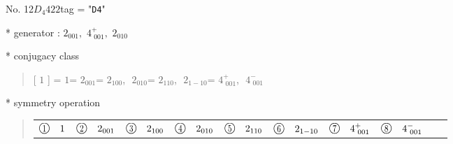 \documentclass[fleqn,10pt,landscape]{jsarticle}
\begin{document}
\newpage

No. 12\quad$D_{4}$\quad$422$\quad[ tetragonal ]
tag = "{\tt D4}"

* generator : $2{}_{001},\,\,4^{+}_{\,\,001},\,\,2{}_{010}$

* conjugacy class
\begin{quote}
[ $1$ ] = \quad $1$\newline[ $2{}_{001}$ ] = \quad $2{}_{001}$\newline[ $2{}_{100}$ ] = \quad $2{}_{100}$,\,\, $2{}_{010}$\newline[ $2{}_{110}$ ] = \quad $2{}_{110}$,\,\, $2{}_{1-10}$\newline[ $4^{+}_{\,\,001}$ ] = \quad $4^{+}_{\,\,001}$,\,\, $4^{-}_{\,\,001}$\newline
\end{quote}

* symmetry operation
\begin{quote}
\begin{tabular}{llllllllll}
$ {\ooalign{\hfil\resizebox{.8\width}{\height}{1}\hfil\crcr\raise.1ex\hbox{\large$\bigcirc$}}}\quad 1 $ & $ {\ooalign{\hfil\resizebox{.8\width}{\height}{2}\hfil\crcr\raise.1ex\hbox{\large$\bigcirc$}}}\quad 2{}_{001} $ & $ {\ooalign{\hfil\resizebox{.8\width}{\height}{3}\hfil\crcr\raise.1ex\hbox{\large$\bigcirc$}}}\quad 2{}_{100} $ & $ {\ooalign{\hfil\resizebox{.8\width}{\height}{4}\hfil\crcr\raise.1ex\hbox{\large$\bigcirc$}}}\quad 2{}_{010} $ & $ {\ooalign{\hfil\resizebox{.8\width}{\height}{5}\hfil\crcr\raise.1ex\hbox{\large$\bigcirc$}}}\quad 2{}_{110} $ & $ {\ooalign{\hfil\resizebox{.8\width}{\height}{6}\hfil\crcr\raise.1ex\hbox{\large$\bigcirc$}}}\quad 2{}_{1-10} $ & $ {\ooalign{\hfil\resizebox{.8\width}{\height}{7}\hfil\crcr\raise.1ex\hbox{\large$\bigcirc$}}}\quad 4^{+}_{\,\,001} $ & $ {\ooalign{\hfil\resizebox{.8\width}{\height}{8}\hfil\crcr\raise.1ex\hbox{\large$\bigcirc$}}}\quad 4^{-}_{\,\,001} $
\end{tabular}
\end{quote}
\end{document}
